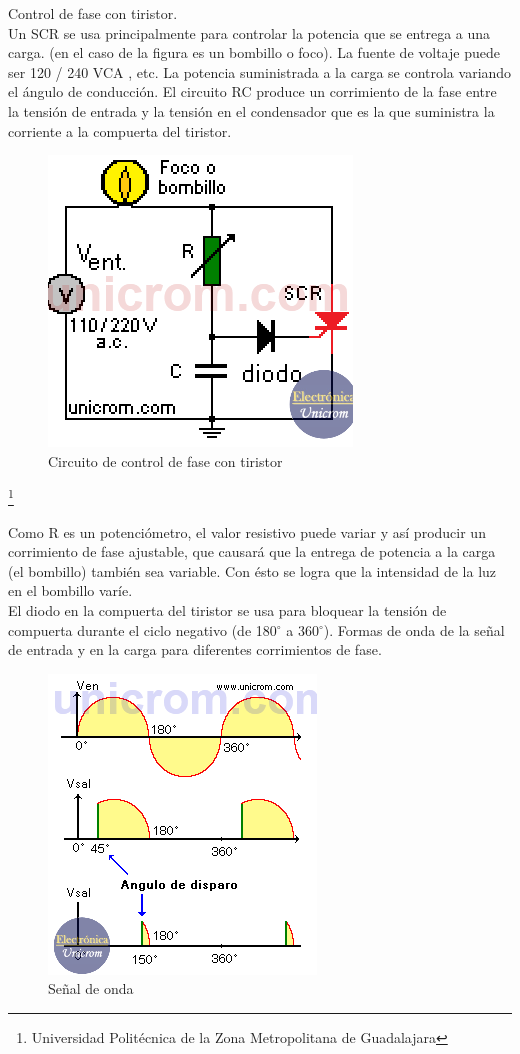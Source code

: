 \documentclass[10pt,a4paper]{article}
\begin{document}
Control de fase con tiristor.\\
Un SCR se usa principalmente para controlar la potencia que se entrega a una carga. (en el caso de la figura es un bombillo o foco). La fuente de voltaje puede ser 120 / 240 VCA , etc. La potencia suministrada a la carga se controla variando el ángulo de conducción. El circuito RC produce un corrimiento de la fase entre la tensión de entrada y la tensión en el condensador que es la que suministra la corriente a la compuerta del tiristor.
\begin{figure}[hbtp]
\centering
\includegraphics[scale=0.5]{Pictures/Control.PNG}
\caption{Circuito de control de fase con tiristor}
\end{figure}
\footnote{Universidad Politécnica de la Zona Metropolitana de Guadalajara}

\newpage
Como R es un potenciómetro, el valor resistivo puede variar y así producir un corrimiento de fase ajustable, que causará que la entrega de potencia a la carga (el bombillo) también sea variable. Con ésto se logra que la intensidad de la luz en el bombillo varíe.\\

El diodo en la compuerta del tiristor se usa para bloquear la tensión de compuerta durante el ciclo negativo (de 180$^{\circ}$ a 360$^{\circ}$). Formas de onda de la señal de entrada y en la carga para diferentes corrimientos de fase.\\
\begin{figure}[hbtp]
\centering
\includegraphics[scale=0.7]{Pictures/Ondas.PNG}
\caption{Señal de onda}
\end{figure}
\end{document}
